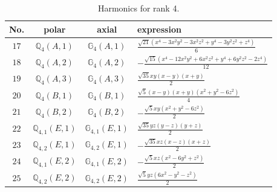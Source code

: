 \documentclass[fleqn,8pt,landscape]{jsarticle}
\begin{document}
\begin{table}[ht!]
\begin{center}
\caption{Harmonics for rank 4.}
\renewcommand{\arraystretch}{1.3}
\begin{tabular}{cccl} \hline \hline
No. & polar & axial & expression \\ \hline
$ 17 $ & $ \mathbb{Q}_{4}(A,1) $ & $ \mathbb{G}_{4}(A,1) $ & $ \frac{\sqrt{21} \left(x^{4} - 3 x^{2} y^{2} - 3 x^{2} z^{2} + y^{4} - 3 y^{2} z^{2} + z^{4}\right)}{6} $ \\
$ 18 $ & $ \mathbb{Q}_{4}(A,2) $ & $ \mathbb{G}_{4}(A,2) $ & $ - \frac{\sqrt{15} \left(x^{4} - 12 x^{2} y^{2} + 6 x^{2} z^{2} + y^{4} + 6 y^{2} z^{2} - 2 z^{4}\right)}{12} $ \\
$ 19 $ & $ \mathbb{Q}_{4}(A,3) $ & $ \mathbb{G}_{4}(A,3) $ & $ \frac{\sqrt{35} x y \left(x - y\right) \left(x + y\right)}{2} $ \\
$ 20 $ & $ \mathbb{Q}_{4}(B,1) $ & $ \mathbb{G}_{4}(B,1) $ & $ \frac{\sqrt{5} \left(x - y\right) \left(x + y\right) \left(x^{2} + y^{2} - 6 z^{2}\right)}{4} $ \\
$ 21 $ & $ \mathbb{Q}_{4}(B,2) $ & $ \mathbb{G}_{4}(B,2) $ & $ - \frac{\sqrt{5} x y \left(x^{2} + y^{2} - 6 z^{2}\right)}{2} $ \\
$ 22 $ & $ \mathbb{Q}_{4,1}(E,1) $ & $ \mathbb{G}_{4,1}(E,1) $ & $ \frac{\sqrt{35} y z \left(y - z\right) \left(y + z\right)}{2} $ \\
$ 23 $ & $ \mathbb{Q}_{4,2}(E,1) $ & $ \mathbb{G}_{4,2}(E,1) $ & $ - \frac{\sqrt{35} x z \left(x - z\right) \left(x + z\right)}{2} $ \\
$ 24 $ & $ \mathbb{Q}_{4,1}(E,2) $ & $ \mathbb{G}_{4,1}(E,2) $ & $ - \frac{\sqrt{5} x z \left(x^{2} - 6 y^{2} + z^{2}\right)}{2} $ \\
$ 25 $ & $ \mathbb{Q}_{4,2}(E,2) $ & $ \mathbb{G}_{4,2}(E,2) $ & $ \frac{\sqrt{5} y z \left(6 x^{2} - y^{2} - z^{2}\right)}{2} $ \\
 \hline \hline
\end{tabular}
\end{center}
\end{table}
\end{document}
